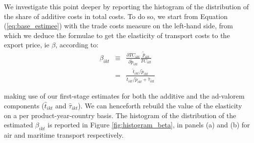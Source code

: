 \documentclass[a4paper,11pt]{article}
\begin{document}
We investigate this point deeper by reporting the histogram of the distribution of the share of additive costs in total costs. To do so, we start from Equation (\ref{eq:base_estimee}) with the trade costs measure on the left-hand side, from which we deduce the formulae to get the elasticity of transport costs to the export price, ie $\beta$, according to:
\begin{eqnarray*}
\beta_{ikt} &\equiv& \frac{\partial TC_{ikt}}{\partial \widetilde{p}_{ikt}}\frac{\widetilde{p}_{ikt}}{TC_{ikt}} \\
&=& \frac{\widehat{t}_{ikt}/\widetilde{p}_{ikt}}{\widehat{t}_{ikt}/\widetilde{p}_{ikt}+\widehat{\tau}_{ikt}}
\end{eqnarray*}

\noindent making use of our first-stage estimates for both the additive and the ad-valorem components ($\widehat{t}_{ikt}$ and $\widehat{\tau}_{ikt}$). We can henceforth rebuild the value of the elasticity on a per product-year-country basis. The histogram of the distribution of the estimated $\beta_{ikt}$ is reported in Figure \ref{fig:histogram_beta}, in panels (a) and (b) for air and maritime transport respectively.
\end{document}
